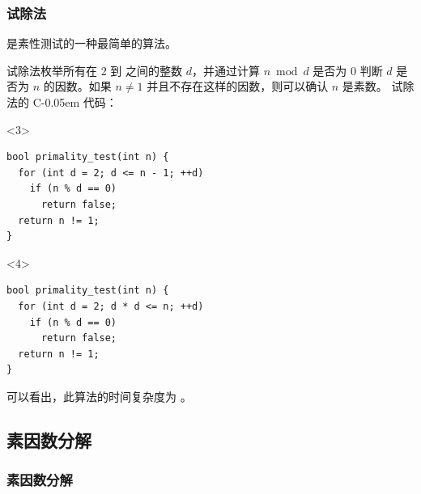 \documentclass{../pkslide}
\newcommand{\Cpp}{\texorpdfstring{C\kern-0.05em\protect\raisebox{.35ex}{\textsmaller[2]{+\kern-0.05em+}}}{C++}}
\begin{document}
\begin{frame}[fragile]
  \frametitle{试除法}
  
  是素性测试的一种最简单的算法。
  
  \emptyline
  
  \pause
  
  试除法枚举所有在 $2$ 到  之间的整数 $d$，并通过计算 $n \bmod d$ 是否为 $0$ 判断 $d$ 是否为 $n$ 的因数。如果 $n \ne 1$ 并且不存在这样的因数，则可以确认 $n$ 是素数。%
  \pause%
  试除法的 \Cpp{} 代码：
  
  \begin{onlyenv}<3>
\begin{verbatim}
bool primality_test(int n) {
  for (int d = 2; d <= n - 1; ++d)
    if (n % d == 0)
      return false;
  return n != 1;
}
\end{verbatim}
  \end{onlyenv}
  
  \begin{onlyenv}<4>
\begin{verbatim}
bool primality_test(int n) {
  for (int d = 2; d * d <= n; ++d)
    if (n % d == 0)
      return false;
  return n != 1;
}
\end{verbatim}
  \end{onlyenv}
  
  可以看出，此算法的时间复杂度为 。
  
\end{frame}


\subsection{素因数分解}
\subsubsection*{素因数分解}

\end{document}
